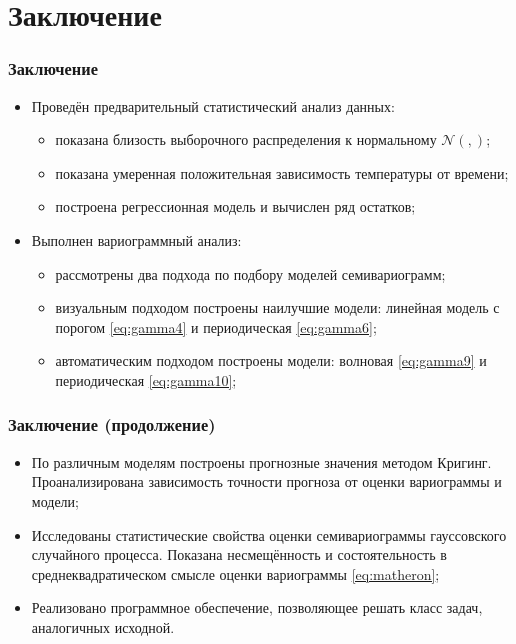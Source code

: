 \documentclass{beamer}
\newcommand{\inp}[1]{}
\newcommand{\descriptive}[2]{\inp{#1/descriptive/#2}}
\newcommand{\normaldistr}{$\mathcal{N}(\descriptive{original}{mean}, \descriptive{original}{variance})$}
\begin{document}
\section{Заключение}
\begin{frame}
  \frametitle{Заключение}
  \begin{itemize}
    \item Проведён предварительный статистический анализ данных:
      \begin{itemize}
        \item показана близость выборочного распределения к нормальному \normaldistr;
        \item показана умеренная положительная зависимость температуры от времени;
        \item построена регрессионная модель и вычислен ряд остатков;
      \end{itemize}
    \item Выполнен вариограммный анализ:
      \begin{itemize}
        \item рассмотрены два подхода по подбору моделей семивариограмм;
        \item визуальным подходом построены наилучшие модели: линейная модель с порогом \eqref{eq:gamma4} и периодическая \eqref{eq:gamma6};
        \item автоматическим подходом построены модели: волновая \eqref{eq:gamma9} и периодическая \eqref{eq:gamma10};
      \end{itemize}
  \end{itemize}
\end{frame}

\begin{frame}
  \frametitle{Заключение (продолжение)}
  \begin{itemize}
    \item По различным моделям построены прогнозные значения методом Кригинг. Проанализирована зависимость точности прогноза от оценки вариограммы и модели;
    \item Исследованы статистические свойства оценки семивариограммы гауссовского случайного процесса. Показана несмещённость и состоятельность в среднеквадратическом смысле оценки вариограммы \eqref{eq:matheron};
    \item Реализовано программное обеспечение, позволяющее решать класс задач, аналогичных исходной.
  \end{itemize}
\end{frame}
\end{document}
